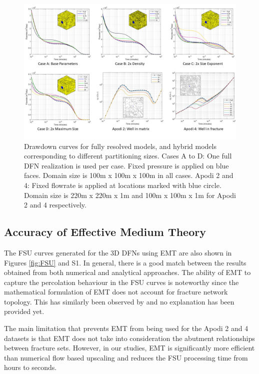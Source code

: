 \documentclass[draft]{agujournal2018}
\begin{document}
\begin{figure}[h]
	\centering
	
	\includegraphics[width=\textwidth]{DD_main/DD_main.jpg}
	
	\caption{Drawdown curves for fully resolved models, and hybrid models corresponding to different partitioning sizes. Cases A to D: One full DFN realization is used per case. Fixed pressure is applied on blue faces. Domain size is 100m x 100m x 100m in all cases. Apodi 2 and 4: Fixed flowrate is applied at locations marked with blue circle. Domain size is 220m x 220m x 1m and 100m x 100m x 1m for Apodi 2 and 4 respectively.}
	\label{fig:DD}
\end{figure}

\subsection{Accuracy of Effective Medium Theory}
The FSU curves generated for the 3D DFNs using EMT are also shown in Figures \ref{fig:FSU} and S1. In general, there is a good match between the results obtained from both numerical and analytical approaches. The ability of EMT to capture the percolation behaviour in the FSU curves is noteworthy since the mathematical formulation of EMT does not account for fracture network topology. This has similarly been observed by \citet{Saevik2013} and no explanation has been provided yet.

The main limitation that prevents EMT from being used for the Apodi 2 and 4 datasets is that EMT does not take into consideration the abutment relationships between fracture sets. However, in our studies, EMT is significantly more efficient than numerical flow based upscaling and reduces the FSU processing time from hours to seconds.
\end{document}
